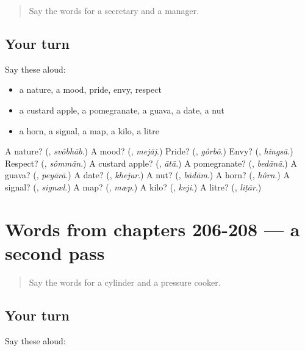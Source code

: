 \label{lesson:BN-R208-first-pass-words-from-chapters-203-205}



\begin{quote}
Say the words for a secretary and a manager.
\end{quote}

\subsection*{Your turn}
Say these aloud:

\begin{itemize}
\raggedright
  \item a nature, a mood, pride, envy, respect
  \item a custard apple, a pomegranate, a guava, a date, a nut
  \item a horn, a signal, a map, a kilo, a litre
\end{itemize}

\begin{tcolorbox}[breakable,colback=teal!4,colframe=teal!35!black,title={Before you move on}]
A nature? (\textbf{}, \emph{svôbhāb}.) A mood? (\textbf{}, \emph{mejāj}.) Pride? (\textbf{}, \emph{gôrbô}.) Envy? (\textbf{}, \emph{hingsā}.) Respect? (\textbf{}, \emph{sômmān}.) A custard apple? (\textbf{}, \emph{ātā}.) A pomegranate? (\textbf{}, \emph{bedānā}.) A guava? (\textbf{}, \emph{peyārā}.) A date? (\textbf{}, \emph{khejur}.) A nut? (\textbf{}, \emph{bādām}.) A horn? (\textbf{}, \emph{hôrn}.) A signal? (\textbf{}, \emph{signæl}.) A map? (\textbf{}, \emph{mæp}.) A kilo? (\textbf{}, \emph{keji}.) A litre? (\textbf{}, \emph{liṭār}.)
\end{tcolorbox}
\section[(dialogue)]{Words from chapters 206-208 — a second pass}

\label{lesson:BN-R208-second-pass-words-from-chapters-206-208}



\begin{quote}
Say the words for a cylinder and a pressure cooker.
\end{quote}

\subsection*{Your turn}
Say these aloud:

